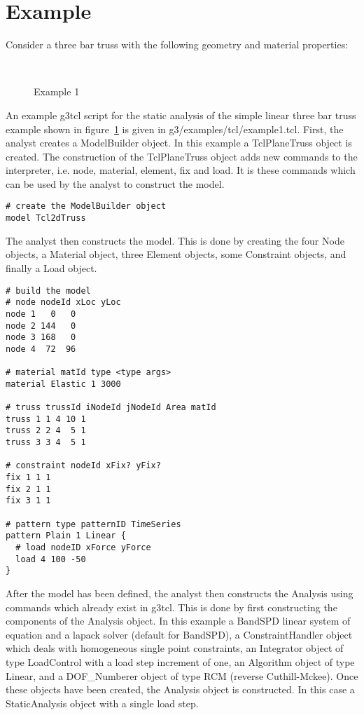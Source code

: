\documentclass[12pt]{article}
\begin{document}
\section{Example}
Consider a three bar truss with the following geometry and material
properties: 

\begin{figure}[htpb]
\begin{center}
\leavevmode
\hbox{%
}
\end{center}
\caption{Example 1}
\label{example1}
\end{figure}

\noindent An example g3tcl script for the static analysis of the
simple linear three bar truss example shown in figure~\ref{example1} is
given in {\sf g3/examples/tcl/example1.tcl}. First, the analyst creates a
ModelBuilder object. In this example a TclPlaneTruss object is
created. The construction of the TclPlaneTruss object adds new
commands to the interpreter, i.e. node, material, element, fix and
load. It is these commands which can be used by the analyst to
construct the model. 

{\sf\small \begin{verbatim}
# create the ModelBuilder object
model Tcl2dTruss
\end{verbatim} }

The analyst then constructs the model. This is done by creating
the four Node objects, a Material object, three Element objects, some
Constraint objects, and finally a Load object. 

{\sf\small \begin{verbatim}
# build the model 
# node nodeId xLoc yLoc
node 1   0   0 
node 2 144   0 
node 3 168   0
node 4  72  96

# material matId type <type args>
material Elastic 1 3000

# truss trussId iNodeId jNodeId Area matId
truss 1 1 4 10 1
truss 2 2 4  5 1
truss 3 3 4  5 1

# constraint nodeId xFix? yFix?
fix 1 1 1
fix 2 1 1
fix 3 1 1

# pattern type patternID TimeSeries
pattern Plain 1 Linear {
  # load nodeID xForce yForce
  load 4 100 -50
}

\end{verbatim} }

After the model has been defined, the analyst then constructs the
Analysis using commands which already exist in g3tcl. This is done by
first constructing the components of the Analysis object. In this
example a BandSPD linear system of equation and a lapack solver
(default for BandSPD), a ConstraintHandler object which deals with
homogeneous single point constraints, an Integrator object of type
LoadControl with a load step increment of one, an Algorithm object of
type Linear, and a DOF\_Numberer object of type RCM (reverse
Cuthill-Mckee). Once these objects have been created, the Analysis
object is constructed. In this case a StaticAnalysis object with a
single load step. 
\end{document}
